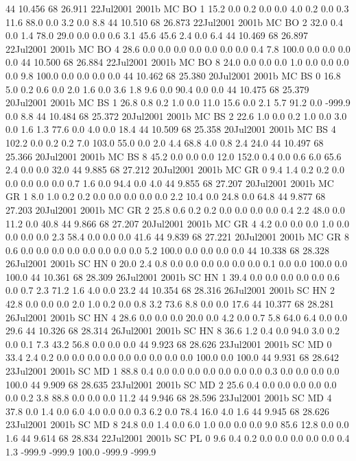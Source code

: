 44 10.456	68 26.911	22Jul2001	2001b	MC	BO	1	15.2	0.0	0.2	0.0	0.0	4.0	0.2	0.0	0.3	11.6	88.0	0.0	3.2	0.0	8.8
44 10.510	68 26.873	22Jul2001	2001b	MC	BO	2	32.0	0.4	0.0	1.4	78.0	29.0	0.0	0.0	0.6	3.1	45.6	45.6	2.4	0.0	6.4
44 10.469	68 26.897	22Jul2001	2001b	MC	BO	4	28.6	0.0	0.0	0.0	0.0	0.0	0.0	0.0	0.4	7.8	100.0	0.0	0.0	0.0	0.0
44 10.500	68 26.884	22Jul2001	2001b	MC	BO	8	24.0	0.0	0.0	0.0	1.0	0.0	0.0	0.0	0.0	9.8	100.0	0.0	0.0	0.0	0.0
44 10.462	68 25.380	20Jul2001	2001b	MC	BS	0	16.8	5.0	0.2	0.6	0.0	2.0	1.6	0.0	3.6	1.8	9.6	0.0	90.4	0.0	0.0
44 10.475	68 25.379	20Jul2001	2001b	MC	BS	1	26.8	0.8	0.2	1.0	0.0	11.0	15.6	0.0	2.1	5.7	91.2	0.0	-999.9	0.0	8.8
44 10.484	68 25.372	20Jul2001	2001b	MC	BS	2	22.6	1.0	0.0	0.2	1.0	0.0	3.0	0.0	1.6	1.3	77.6	0.0	4.0	0.0	18.4
44 10.509	68 25.358	20Jul2001	2001b	MC	BS	4	102.2	0.0	0.2	0.2	7.0	103.0	55.0	0.0	2.0	4.4	68.8	4.0	0.8	2.4	24.0
44 10.497	68 25.366	20Jul2001	2001b	MC	BS	8	45.2	0.0	0.0	0.0	12.0	152.0	0.4	0.0	0.6	6.0	65.6	2.4	0.0	0.0	32.0
44 9.885	68 27.212	20Jul2001	2001b	MC	GR	0	9.4	1.4	0.2	0.2	0.0	0.0	0.0	0.0	0.0	0.7	1.6	0.0	94.4	0.0	4.0
44 9.855	68 27.207	20Jul2001	2001b	MC	GR	1	8.0	1.0	0.2	0.2	0.0	0.0	0.0	0.0	0.0	2.2	10.4	0.0	24.8	0.0	64.8
44 9.877	68 27.203	20Jul2001	2001b	MC	GR	2	25.8	0.6	0.2	0.2	0.0	0.0	0.0	0.0	0.4	2.2	48.0	0.0	11.2	0.0	40.8
44 9.866	68 27.207	20Jul2001	2001b	MC	GR	4	4.2	0.0	0.0	0.0	1.0	0.0	0.0	0.0	0.0	2.3	58.4	0.0	0.0	0.0	41.6
44 9.839	68 27.221	20Jul2001	2001b	MC	GR	8	0.6	0.0	0.0	0.0	0.0	0.0	0.0	0.0	0.0	5.2	100.0	0.0	0.0	0.0	0.0
44 10.338	68 28.328	26Jul2001	2001b	SC	HN	0	20.0	2.4	0.8	0.0	0.0	0.0	0.0	0.0	0.0	0.1	0.0	0.0	100.0	0.0	100.0
44 10.361	68 28.309	26Jul2001	2001b	SC	HN	1	39.4	0.0	0.0	0.0	0.0	0.0	0.6	0.0	0.7	2.3	71.2	1.6	4.0	0.0	23.2
44 10.354	68 28.316	26Jul2001	2001b	SC	HN	2	42.8	0.0	0.0	0.0	2.0	1.0	0.2	0.0	0.8	3.2	73.6	8.8	0.0	0.0	17.6
44 10.377	68 28.281	26Jul2001	2001b	SC	HN	4	28.6	0.0	0.0	0.0	20.0	0.0	4.2	0.0	0.7	5.8	64.0	6.4	0.0	0.0	29.6
44 10.326	68 28.314	26Jul2001	2001b	SC	HN	8	36.6	1.2	0.4	0.0	94.0	3.0	0.2	0.0	0.1	7.3	43.2	56.8	0.0	0.0	0.0
44 9.923	68 28.626	23Jul2001	2001b	SC	MD	0	33.4	2.4	0.2	0.0	0.0	0.0	0.0	0.0	0.0	0.0	0.0	0.0	100.0	0.0	100.0
44 9.931	68 28.642	23Jul2001	2001b	SC	MD	1	88.8	0.4	0.0	0.0	0.0	0.0	0.0	0.0	0.0	0.3	0.0	0.0	0.0	0.0	100.0
44 9.909	68 28.635	23Jul2001	2001b	SC	MD	2	25.6	0.4	0.0	0.0	0.0	0.0	0.0	0.0	0.2	3.8	88.8	0.0	0.0	0.0	11.2
44 9.946	68 28.596	23Jul2001	2001b	SC	MD	4	37.8	0.0	1.4	0.0	6.0	4.0	0.0	0.0	0.3	6.2	0.0	78.4	16.0	4.0	1.6
44 9.945	68 28.626	23Jul2001	2001b	SC	MD	8	24.8	0.0	1.4	0.0	6.0	1.0	0.0	0.0	0.0	9.0	85.6	12.8	0.0	0.0	1.6
44 9.614	68 28.834	22Jul2001	2001b	SC	PL	0	9.6	0.4	0.2	0.0	0.0	0.0	0.0	0.0	0.4	1.3	-999.9	-999.9	100.0	-999.9	-999.9

